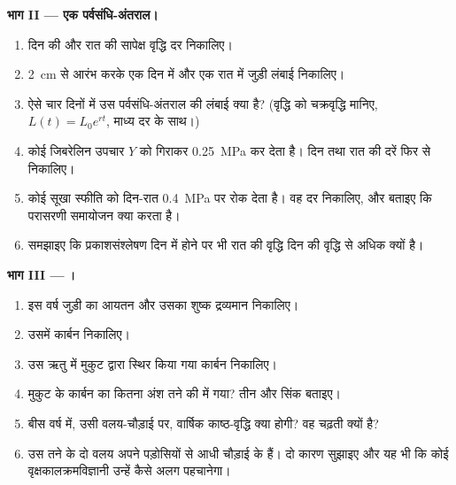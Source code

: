 \begin{problem}
\medskip
\noindent\textbf{भाग II --- एक पर्वसंधि-अंतराल।}
\begin{enumerate}[resume]
  \item दिन की और रात की सापेक्ष वृद्धि दर निकालिए।
  \item \qty{2}{cm} से आरंभ करके एक दिन में और एक रात में जुड़ी लंबाई
        निकालिए।
  \item ऐसे चार दिनों में उस पर्वसंधि-अंतराल की लंबाई क्या है?
        (वृद्धि को चक्रवृद्धि मानिए, $L(t) = L_0 e^{rt}$, माध्य दर के साथ।)
  \item कोई जिबरेलिन उपचार $Y$ को गिराकर \qty{0.25}{MPa} कर देता है।
        दिन तथा रात की दरें फिर से निकालिए।
  \item कोई सूखा स्फीति को दिन-रात \qty{0.4}{MPa} पर रोक देता है।
        वह दर निकालिए, और बताइए कि परासरणी समायोजन क्या करता है।
  \item समझाइए कि प्रकाशसंश्लेषण दिन में होने पर भी रात की वृद्धि दिन की
        वृद्धि से अधिक क्यों है।
\end{enumerate}

\medskip
\noindent\textbf{भाग III --- ।}
\begin{enumerate}[resume]
  \item इस वर्ष जुड़ी  का आयतन और उसका शुष्क द्रव्यमान निकालिए।
  \item उसमें कार्बन निकालिए।
  \item उस ऋतु में मुकुट द्वारा स्थिर किया गया कार्बन निकालिए।
  \item मुकुट के कार्बन का कितना अंश तने की  में गया?
        तीन और सिंक बताइए।
  \item बीस वर्ष में, उसी वलय-चौड़ाई पर, वार्षिक
        काष्ठ-वृद्धि क्या होगी? वह चढ़ती क्यों है?
  \item उस तने के दो वलय अपने पड़ोसियों से आधी चौड़ाई के हैं। दो कारण
        सुझाइए और यह भी कि कोई वृक्षकालक्रमविज्ञानी उन्हें कैसे अलग
        पहचानेगा।
\end{enumerate}


\end{problem}
